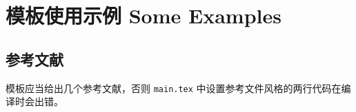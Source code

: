 \chapter{模板使用示例 Some Examples}
\label{cha:examples}

\section{参考文献}
\label{sec:ref}

模板应当给出几个参考文献，否则 \texttt{main.tex} 中设置参考文件风格的两行代码在编译时会出错。\cite{chen2001,ding2001}


